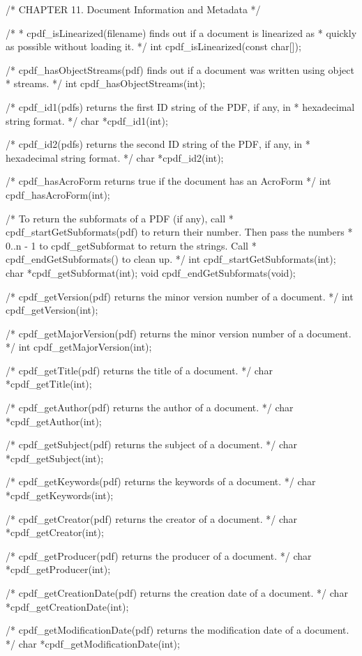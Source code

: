 /* CHAPTER 11. Document Information and Metadata */

/*
 * cpdf_isLinearized(filename) finds out if a document is linearized as
 * quickly as possible without loading it.
 */
int cpdf_isLinearized(const char[]);

/* cpdf_hasObjectStreams(pdf) finds out if a document was written using object
 * streams. */
int cpdf_hasObjectStreams(int);

/* cpdf_id1(pdfs) returns the first ID string of the PDF, if any, in
 * hexadecimal string format. */
char *cpdf_id1(int);

/* cpdf_id2(pdfs) returns the second ID string of the PDF, if any, in
 * hexadecimal string format. */
char *cpdf_id2(int);

/* cpdf_hasAcroForm returns true if the document has an AcroForm */
int cpdf_hasAcroForm(int);

/* To return the subformats of a PDF (if any), call
 * cpdf_startGetSubformats(pdf) to return their number. Then pass the numbers
 * 0..n - 1 to cpdf_getSubformat to return the strings. Call
 * cpdf_endGetSubformats() to clean up. */
int cpdf_startGetSubformats(int);
char *cpdf_getSubformat(int);
void cpdf_endGetSubformats(void);

/* cpdf_getVersion(pdf) returns the minor version number of a document. */
int cpdf_getVersion(int);

/* cpdf_getMajorVersion(pdf) returns the minor version number of a document. */
int cpdf_getMajorVersion(int);

/* cpdf_getTitle(pdf) returns the title of a document. */
char *cpdf_getTitle(int);

/* cpdf_getAuthor(pdf) returns the author of a document. */
char *cpdf_getAuthor(int);

/* cpdf_getSubject(pdf) returns the subject of a document. */
char *cpdf_getSubject(int);

/* cpdf_getKeywords(pdf) returns the keywords of a document. */
char *cpdf_getKeywords(int);

/* cpdf_getCreator(pdf) returns the creator of a document. */
char *cpdf_getCreator(int);

/* cpdf_getProducer(pdf) returns the producer of a document. */
char *cpdf_getProducer(int);

/* cpdf_getCreationDate(pdf) returns the creation date of a document. */
char *cpdf_getCreationDate(int);

/* cpdf_getModificationDate(pdf) returns the modification date of a document. */
char *cpdf_getModificationDate(int);

